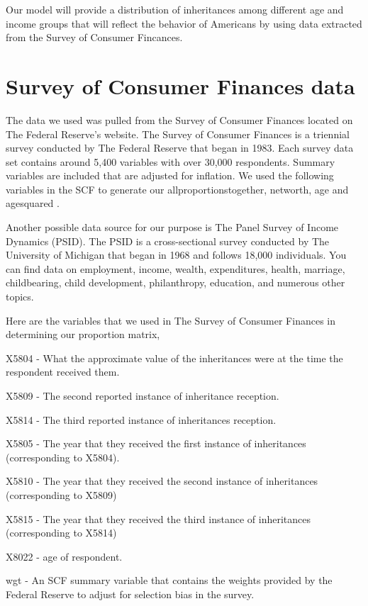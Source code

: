 \documentclass[letterpaper,12pt]{article}
\theoremstyle{definition}
\begin{document}
\begin{spacing}{1.5}
Our model will provide a distribution of inheritances among different age and 
income groups that will reflect the behavior of Americans by using data extracted from the Survey of Consumer Fincances.


\section{Survey of Consumer Finances data}\label{SecSCFdata}


The data we used was pulled from the Survey of Consumer Finances located on The Federal Reserve’s website. The Survey of Consumer Finances is a triennial survey conducted by The Federal Reserve that began in 1983. Each survey data set contains around 5,400 variables with over 30,000 respondents. Summary variables are included that are adjusted for inflation. We used the following variables in the SCF to generate our allproportionstogether, networth, age and agesquared \citet{FED}.

Another possible data source for our purpose is The Panel Survey of Income Dynamics (PSID). The PSID is a cross-sectional survey conducted by The University of Michigan that began in 1968 and follows 18,000 individuals. You can find data on employment, income, wealth, expenditures, health, marriage, childbearing, child development, philanthropy, education, and numerous other topics. \citet{UMich}

Here are the variables that we used in The Survey of Consumer Finances in determining our proportion matrix,

X5804 - What the approximate value of the inheritances were at the time the respondent received them. 

X5809 - The second reported instance of inheritance reception.

X5814 - The third reported instance of inheritances reception.

X5805 - The year that they received the first instance of inheritances (corresponding to X5804).

X5810 - The year that they received the second instance of inheritances (corresponding to X5809)

X5815 - The year that they received the third instance of inheritances (corresponding to X5814)

X8022 - age of respondent.

wgt - An SCF summary variable that contains the weights provided by the Federal Reserve to adjust for selection bias in the survey.


\end{spacing}
\end{document}
